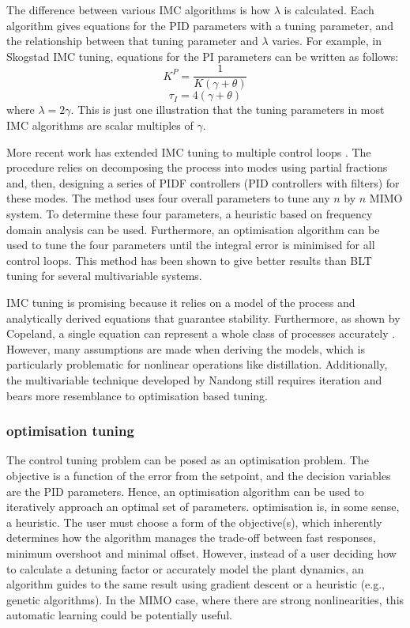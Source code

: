 The difference between various IMC algorithms is how $\lambda$ is calculated. Each algorithm gives equations for the PID parameters with a tuning parameter, and the relationship between that tuning parameter and $\lambda$ varies. For example, in Skogstad IMC tuning, equations for the PI parameters can be written as follows\cite{Copeland2010}: 
\begin{equation}
    K^P = \frac{1}{K(\gamma +\theta)}
\end{equation}
\begin{equation}
    \tau_I = 4(\gamma+\theta)
\end{equation}
where $\lambda=2\gamma$. This is just one illustration that the tuning parameters in most IMC algorithms are scalar multiples of $\gamma$.

More recent work has extended IMC tuning to multiple control loops \cite{Nandong2013, Nandong2015}. The procedure relies on decomposing the process into modes using partial fractions and, then, designing a series of PIDF controllers (PID controllers with filters) for these modes. The method uses four overall parameters to tune any $n$ by $n$ MIMO system. To determine these four parameters, a heuristic based on frequency domain analysis can be used. Furthermore, an optimisation algorithm can be used to tune the four parameters until the integral error is minimised for all control loops. This method has been shown to give better results than BLT tuning for several  multivariable systems.  

IMC tuning is promising because it relies on a model of the process and analytically derived equations that guarantee stability. Furthermore, as shown by Copeland, a single equation can represent a whole class of processes accurately \cite{Copeland2010}. However, many assumptions are made when deriving the models, which is particularly problematic for nonlinear operations like distillation. Additionally, the multivariable technique developed by Nandong\cite{Nandong2015} still requires iteration and bears more resemblance to optimisation based tuning.

\subsubsection{optimisation tuning}
The control tuning problem can be posed as an optimisation problem.  The objective is a function of the error from the setpoint\cite{Pajares2019, Sumana2010, Rajapandiyan2012, Behroozsarand2012}, and the decision variables  are the PID parameters.  Hence, an optimisation algorithm can be used to iteratively approach an optimal set of parameters. optimisation is, in some sense, a heuristic. The user must choose a form of the objective(s), which inherently determines how the algorithm manages the trade-off between fast responses, minimum overshoot and minimal offset. However, instead of a user deciding how to calculate a detuning factor or accurately model the plant dynamics, an algorithm guides to the same result using gradient descent or a heuristic (e.g., genetic algorithms). In the MIMO case, where there are strong nonlinearities, this automatic learning could be potentially useful. 


